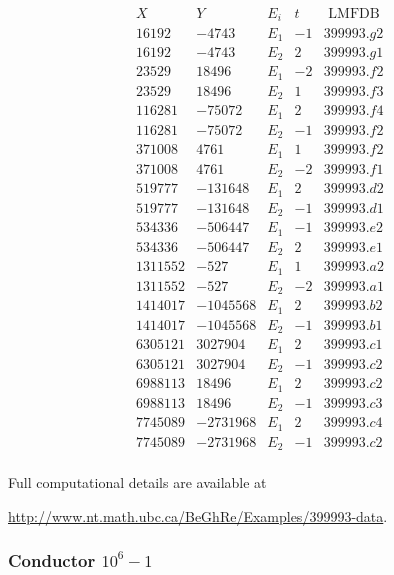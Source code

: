 $$
\begin{array}{c|c|c|c|c}
X & Y & E_i & t & \mbox{ LMFDB} \\ \hline
16192 & -4743 & E_1 & -1 & 399993.g2 \\
16192 & -4743 & E_2 & 2 & 399993.g1 \\
23529 & 18496 & E_1 & -2 & 399993.f2 \\
23529 & 18496 & E_2 & 1 & 399993.f3 \\ 
116281 & -75072 & E_1 & 2 & 399993.f4 \\
116281 & -75072 & E_2 & -1 & 399993.f2 \\
371008 & 4761 & E_1 & 1 & 399993.f2 \\
371008 & 4761 & E_2 & -2 & 399993.f1 \\
519777 & -131648 & E_1 & 2 & 399993.d2   \\
519777 & -131648 & E_2 & -1 & 399993.d1 \\
534336 & -506447 & E_1 & -1 & 399993.e2 \\
534336 & -506447 & E_2 & 2 & 399993.e1 \\
1311552 & -527 & E_1 & 1 & 399993.a2 \\
1311552 & -527 & E_2 & -2 & 399993.a1\\
1414017 & -1045568 & E_1 & 2 & 399993.b2 \\
1414017 & -1045568 & E_2 & -1 & 399993.b1 \\
6305121 & 3027904 & E_1 & 2 & 399993.c1  \\
6305121 & 3027904 & E_2 & -1 & 399993.c2 \\
6988113 & 18496 & E_1 & 2 & 399993.c2 \\
6988113 & 18496 & E_2 & -1 & 399993.c3\\
7745089 & -2731968 & E_1 & 2 & 399993.c4\\
7745089 & -2731968 & E_2 & -1 & 399993.c2 \\
\end{array}
$$

Full computational details are available at
\begin{center}
\url{http://www.nt.math.ubc.ca/BeGhRe/Examples/399993-data}.
\end{center}

\subsubsection{Conductor $10^6-1$}  \label{exe2}

